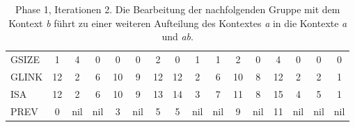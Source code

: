 \begin{table}[H]
\begin{adjustbox}{max width=\textwidth}
\begin{tabular}{lccccccccccccccc}
\multicolumn{1}{l|}{GSIZE}   & \multicolumn{1}{c|}{1}  & \cellcolor[HTML]{\red}4 & 0                         & 0                         & \multicolumn{1}{c|}{0}  & \cellcolor[HTML]{\red}2 & \multicolumn{1}{c|}{\cellcolor[HTML]{\red}0} & \multicolumn{1}{c|}{1}    & \multicolumn{1}{c|}{1}    & 2                          & \multicolumn{1}{c|}{0}     & 4  & 0                         & 0                         & 0   \\
\multicolumn{1}{l|}{GLINK}   & 12                      & 2                         & \cellcolor[HTML]{\red}6 & 10                        & 9                       & 12                        & 12                                             & 2                         & \cellcolor[HTML]{\red}6 & 10                         & 8                          & 12 & 2                         & 2                         & 1   \\
\multicolumn{1}{l|}{ISA}     & 12                      & 2                         & \cellcolor[HTML]{\red}6 & 10                        & 9                       & 13                        & 14                                             & \cellcolor[HTML]{\red}3 & \cellcolor[HTML]{\red}7 & 11                         & 8                          & 15 & \cellcolor[HTML]{\red}4 & \cellcolor[HTML]{\red}5 & 1   \\
\multicolumn{1}{l|}{PREV}    & 0                       & nil                       & nil                       & \cellcolor[HTML]{\red}3 & nil                     & 5                         & 5                                              & nil                       & nil                       & \cellcolor[HTML]{\red}9  & nil                        & 11 & nil                       & nil                       & nil
\end{tabular}
\end{adjustbox}

\caption[Phase 1, Iterationen 2]{Phase 1, Iterationen 2. Die Bearbeitung der nachfolgenden Gruppe mit dem Kontext \textit{b} führt zu einer weiteren Aufteilung des Kontextes \textit{a} in die Kontexte \textit{a} und \textit{ab}.}
\label{table_complex_example_1_2} 
\end{table}

